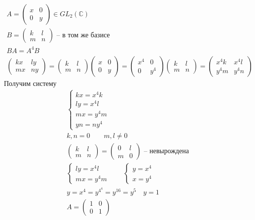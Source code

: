 	\begin{gather*}
		A = 
		\begin{pmatrix}
			x & 0 \\ 0 & y
		\end{pmatrix}
		\in GL_2(\mathbb{C})\\
		B = 
		\begin{pmatrix}
			k & l \\ m & n
		\end{pmatrix}
		\text{ -- в том же базисе}\\
		BA = A^{4}B\\
		\begin{pmatrix}
			kx & ly \\ mx & ny
		\end{pmatrix}
		=
		\begin{pmatrix}
			k & l \\ m & n
		\end{pmatrix}
		\begin{pmatrix}
			x & 0 \\ 0 & y
		\end{pmatrix}
		=
		\begin{pmatrix}
			x^{4} & 0 \\ 0 & y^{4}
		\end{pmatrix}
		\begin{pmatrix}
			k & l \\ m & n
		\end{pmatrix}
		=
		\begin{pmatrix}
			x^{4} k & x^{4} l \\ y^{4} m & y^{4} n
		\end{pmatrix}
	\end{gather*}
	Получим систему
	\begin{gather*}
	\begin{cases}
		kx = x^{4} k\\
		ly = x^{4} l\\
		mx = y^{4} m\\
		yn = n y^{4}
	\end{cases}\\
	k,n = 0\qquad m,l \ne 0\\
	\begin{pmatrix}
		k & l \\ m & n
	\end{pmatrix}
	=
	\begin{pmatrix}
		0 & l \\ m & 0
	\end{pmatrix}
	\text{ -- невырождена}\\
	\begin{cases}
		ly = x^{4}l\\
		mx = y^{4}m
	\end{cases}\qquad
	\begin{cases}
		y = x^{4}\\
		x = y^{4}
	\end{cases}\\
	y = x^{4} = y^{4^{4}} = y^{16} = y^{5}\quad y = 1\\
	A =
	\begin{pmatrix}
		1 & 0 \\ 0 & 1
	\end{pmatrix}
	\end{gather*}
